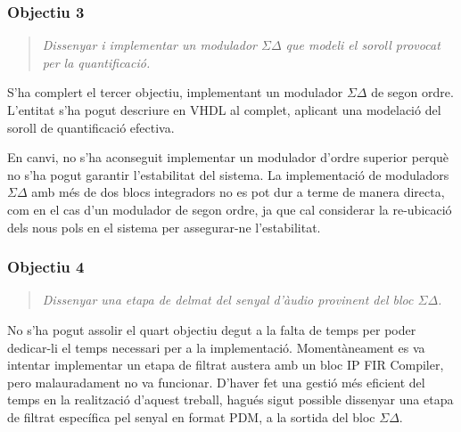 \subsubsection{Objectiu 3}
\begin{quote}
    \textit{Dissenyar i implementar un modulador $\Sigma \Delta$ que modeli el soroll provocat per la quantificació.}
\end{quote}
\par S'ha complert el tercer objectiu, implementant un modulador $\Sigma \Delta$ de segon ordre. L'entitat s'ha pogut descriure en VHDL al complet, aplicant una modelació del soroll de quantificació efectiva. 
\par En canvi, no s'ha aconseguit implementar un modulador d'ordre superior perquè no s'ha pogut garantir l'estabilitat del sistema. La implementació de moduladors $\Sigma \Delta$ amb més de dos blocs integradors no es pot dur a terme de manera directa, com en el cas d'un modulador de segon ordre, ja que cal considerar la re-ubicació dels nous pols en el sistema per assegurar-ne l'estabilitat. 

\subsubsection{Objectiu 4}
\begin{quote}
    \textit{Dissenyar una etapa de delmat del senyal d'àudio provinent del bloc $\Sigma \Delta$.}
\end{quote}
\par No s'ha pogut assolir el quart objectiu degut a la falta de temps per poder dedicar-li el temps necessari per a la implementació. Momentàneament es va intentar implementar un etapa de filtrat austera amb un bloc IP FIR Compiler, pero malauradament no va funcionar. D'haver fet una gestió més eficient del temps en la realització d'aquest treball, hagués sigut possible dissenyar una etapa de filtrat específica pel senyal en format PDM, a la sortida del bloc $\Sigma \Delta$.